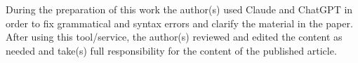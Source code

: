 \documentclass[sn-mathphys-num]{sn-jnl}%
\theoremstyle{thmstyleone}%
\theoremstyle{thmstyletwo}%
\theoremstyle{thmstylethree}%
\begin{document}
During the preparation of this work the author(s) used Claude and ChatGPT in order to fix grammatical and syntax errors and clarify the material in the paper. After using this tool/service, the author(s) reviewed and edited the content as needed and take(s) full responsibility for the content of the published article.


% 






\end{document}
